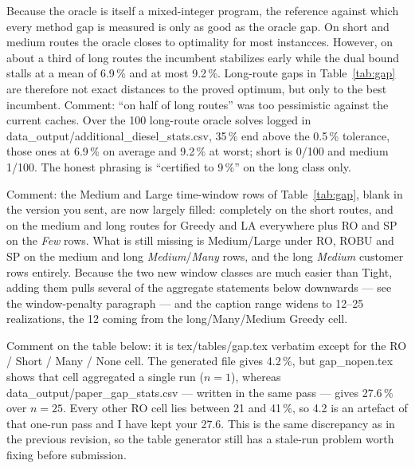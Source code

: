 \documentclass[preprint,12pt,3p]{elsarticle}
\newcommand{\green}[1]{{\color{darkgreen}#1}}
\newcommand{\blue}[1]{{\color{darkblue}#1}}
\begin{document}
Because the oracle is itself a mixed-integer program, the reference against which every method gap is measured is only as good as the oracle gap.
On short and medium routes the oracle closes to optimality for most instancces. However, on \blue{about a third of} long routes the incumbent stabilizes early while the dual bound stalls at \blue{a mean of 6.9\,\% and at most 9.2\,\%}. Long-route gaps in Table~\ref{tab:gap} are therefore not exact distances to the proved optimum, but only to the best incumbent.
\green{Comment: ``on half of long routes'' was too pessimistic against the current
caches. Over the 100 long-route oracle solves logged in
data\_output/additional\_diesel\_stats.csv, 35\,\% end above the 0.5\,\% tolerance,
those ones at 6.9\,\% on average and 9.2\,\% at worst; short is 0/100 and medium 1/100.
The honest phrasing is ``certified to 9\,\%'' on the long class only.}

\green{Comment: the Medium and Large time-window rows of Table~\ref{tab:gap}, blank in
the version you sent, are now largely filled: completely on the short routes, and on
the medium and long routes for Greedy and LA everywhere plus RO and SP on the
\emph{Few} rows. What is still missing is Medium/Large under RO, ROBU and SP on the
medium and long \emph{Medium}/\emph{Many} rows, and the long \emph{Medium} customer
rows entirely. Because the two new window classes are much easier than Tight, adding
them pulls several of the aggregate statements below downwards --- see the
window-penalty paragraph --- and the caption range widens to 12--25 realizations,
the 12 coming from the long/Many/Medium Greedy cell.}

\green{Comment on the table below: it is tex/tables/gap.tex verbatim except for the
RO / Short / Many / None cell. The generated file gives 4.2\,\%, but gap\_nopen.tex
shows that cell aggregated a single run ($n=1$), whereas
data\_output/paper\_gap\_stats.csv --- written in the same pass --- gives 27.6\,\% over
$n=25$. Every other RO cell lies between 21 and 41\,\%, so 4.2 is an artefact of that
one-run pass and I have kept your 27.6. This is the same discrepancy as in the
previous revision, so the table generator still has a stale-run problem worth
fixing before submission.}
\end{document}
